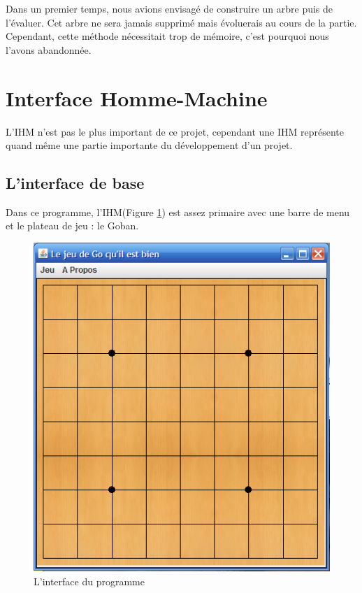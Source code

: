 \documentclass[11pt,a4paper]{article}
\begin{document}
	Dans un premier temps, nous avions envisagé de construire un arbre puis de
	l'évaluer. Cet arbre ne sera jamais supprimé mais évoluerais au cours de la
	partie. Cependant, cette méthode nécessitait trop de mémoire, c'est pourquoi
	nous l'avons abandonnée.
	
\clearpage		
\section{Interface Homme-Machine}
L'IHM n'est pas le plus important de ce projet, cependant une IHM
représente quand même une partie importante du développement d'un projet.
\subsection{L'interface de base}
Dans ce programme, l'IHM(Figure \ref{IHM_Vide}) est assez primaire avec une
barre de menu et le plateau de jeu :  le Goban.\\

	\begin{figure}[!ht]
    	\begin{center}
			\includegraphics[scale=0.5]{IHM_Vide.png}
		\end{center}
	\caption{L'interface du programme}
	\label{IHM_Vide}
	\end{figure}
\end{document}
